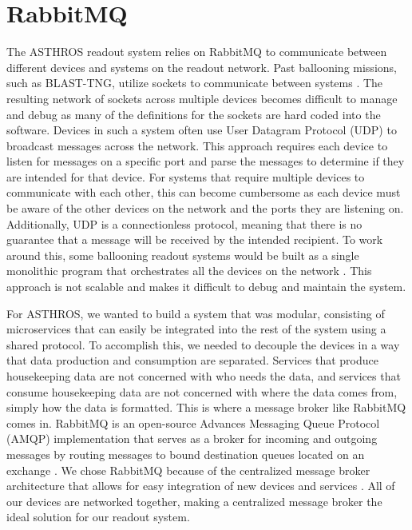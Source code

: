 \section{RabbitMQ}
\label{chap2/section:rmqtools}
The ASTHROS readout system relies on RabbitMQ to communicate between different devices and systems on the readout network.
Past ballooning missions, such as BLAST-TNG, utilize sockets to communicate between systems \citep{gordon2019highly}.
The resulting network of sockets across multiple devices becomes difficult to manage and debug as many of the definitions for the sockets are hard coded into the software.
Devices in such a system often use User Datagram Protocol (UDP) to broadcast messages across the network.
This approach requires each device to listen for messages on a specific port and parse the messages to determine if they are intended for that device.
For systems that require multiple devices to communicate with each other, this can become cumbersome as each device must be aware of the other devices on the network and the ports they are listening on.
Additionally, UDP is a connectionless protocol, meaning that there is no guarantee that a message will be received by the intended recipient.
To work around this, some ballooning readout systems would be built as a single monolithic program that orchestrates all the devices on the network \citep{gordon2019highly}.
This approach is not scalable and makes it difficult to debug and maintain the system.

For ASTHROS, we wanted to build a system that was modular, consisting of microservices that can easily be integrated into the rest of the system using a shared protocol.
To accomplish this, we needed to decouple the devices in a way that data production and consumption are separated.
Services that produce housekeeping data are not concerned with who needs the data, and services that consume housekeeping data are not concerned with where the data comes from, simply how the data is formatted. 
This is where a message broker like RabbitMQ comes in.
RabbitMQ is an open-source Advances Messaging Queue Protocol (AMQP) implementation that serves as a broker for incoming and outgoing messages by routing messages to bound destination queues located on an exchange \citep{dunne2018comparison}.
We chose RabbitMQ because of the centralized message broker architecture that allows for easy integration of new devices and services \citep{toshev2015learning}.
All of our devices are networked together, making a centralized message broker the ideal solution for our readout system.

